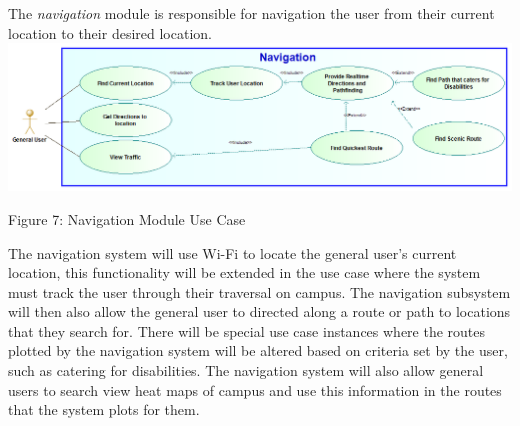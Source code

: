 The \textit{navigation} module is responsible for navigation the user from their current location to their desired location.  \\
\includegraphics[width=\textwidth]{images/Navigation_Use_Case_Diagram.png}

\begin{center}
	Figure 7: Navigation Module Use Case
\end{center}

{The navigation system will use Wi-Fi to locate the general user's current location, this functionality will be extended in the use case where the system must track the user through their traversal on campus. The navigation subsystem will then also allow the general user to directed along a route or path to locations that they search for. There will be special use case instances where the routes plotted by the navigation system will be altered based on criteria set by the user, such as catering for disabilities. The navigation system will also allow general users to search view heat maps of campus and use this information in the routes that the system plots for them.}
